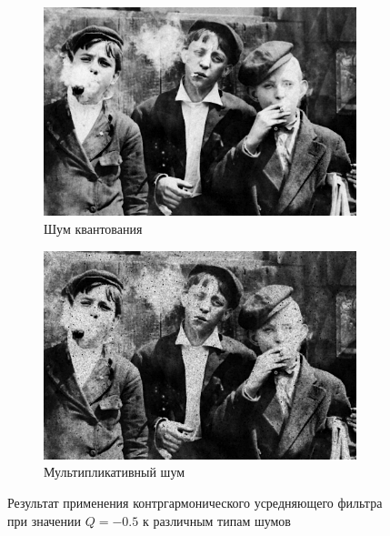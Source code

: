 \begin{figure}[ht!]
\begin{subfigure}[b]{0.5\linewidth}
      \includegraphics[width=0.95\linewidth]{../Contraharmonic_Filter/Contraharmonic_Poisson_noise_(m,n=(3,_3),q=-0.5).jpg} 
      \caption{Шум квантования} 
      \label{contraharmonic_-0.5:e}
    \end{subfigure}%
    \begin{subfigure}[b]{0.5\linewidth}
        \centering
        \includegraphics[width=0.95\linewidth]{../Contraharmonic_Filter/Contraharmonic_Speckle_noise_(m,n=(3,_3),q=-0.5).jpg} 
        \caption{Мультипликативный шум} 
        \label{contraharmonic_-0.5:f} 
    \end{subfigure} 
    \caption{Результат применения контргармонического усредняющего фильтра при значении $Q = -0.5$ к различным типам шумов}
    \label{img:contraharmonic_-0.5} 
  \end{figure}

